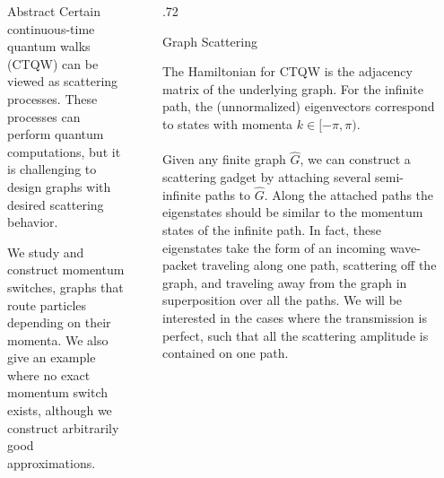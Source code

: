 \documentclass{beamer}
\newlength{\sepwid}
\newlength{\onecolwid}
\newlength{\twocolwid}
\begin{document}
\begin{frame}[t]
  \begin{columns}[t]												%
    \begin{column}{\sepwid}\end{column}			%
    \begin{column}{\onecolwid}
      \begin{alertblock}{Abstract}
        Certain continuous-time quantum walks (CTQW) can be viewed as scattering processes. These processes can perform quantum computations, but it is challenging to design graphs with desired scattering behavior.
        \vspace{1cm}
        
        We study and construct momentum switches, graphs that route particles depending on their momenta. We also give an example where no exact momentum switch exists, although we construct arbitrarily good approximations.
      \end{alertblock}
    \end{column}
    

    \begin{column}{\sepwid}\end{column}
    \begin{column}{.72\twocolwid}
      \begin{block}{Graph Scattering}
      
        The Hamiltonian for CTQW is the adjacency matrix of the underlying graph.  For the infinite path, the (unnormalized) eigenvectors correspond to states with momenta $k\in [-\pi,\pi)$.
        \\~\\
        Given any finite graph $\hat{G}$, we can construct a scattering gadget by attaching several semi-infinite paths to $\hat{G}$.  Along the attached paths the eigenstates should be similar to the momentum states of the infinite path.  In fact, these eigenstates take the form of an incoming wave-packet traveling along one path, scattering off the graph, and traveling away from the graph in superposition over all the paths.  We will be interested in the cases where the transmission is perfect, such that all the scattering amplitude is contained on one path.
        \end{block}
      \end{column}
      
      

\end{columns}
\end{frame}
\end{document}
